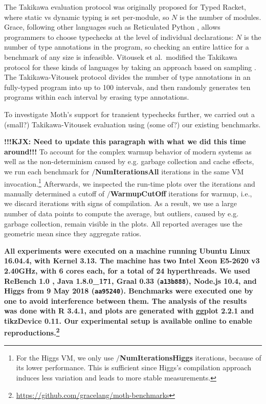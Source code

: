 \documentclass[sigplan,10pt,review,screen]{acmart}\settopmatter{printfolios=true}
\newcommand{\code}[1]{\texttt{#1}}
\newcommand{\ie}{i.e.\xspace}
\newcommand{\eg}{e.g.\xspace}
\begin{document}
The Takikawa evaluation protocol was originally proposed for Typed
Racket, where static vs dynamic typing is set per-module, so $N$ is
the number of modules. Grace, following other languages such as
Reticulated Python \cite{reticPython2014,monotonic2015,Vitousek2017},
allows programmers to choose typechecks at the level of individual
declarations: $N$ is the number of type annotations in the program,
so checking an entire lattice for a benchmark of any size
is infeasible.  Vitousek et al.\ modified the Takikawa protocol for
these kinds of languages by taking an approach based on sampling
\cite{vitousek-transient-arXive-2019}.  The Takikawa-Vitousek protocol
divides the number of type annotations in an fully-typed program into
up to 100 intervals, and then randomly generates ten programs within
each interval by erasing type annotations.

To investigate Moth's support for transient typechecks further, we
carried out a (small?) Takikawa-Vitousek evaluation using (some of?)
our existing benchmarks.

\textbf{!!!KJX: Need to update this paragraph with what we did this time around!!!}
To account for the complex warmup behavior
of modern systems\citep{Barrett:2017:VMW} as well as
the non-determinism caused by \eg garbage collection and cache effects,
we run each benchmark for \textbf{$/$NumIterationsAll} iterations in the same
VM invocation.\footnote{
For the Higgs VM, we only use \textbf{$/$NumIterationsHiggs} iterations,
because of its lower performance.
This is sufficient since Higgs's compilation approach induces less variation
and leads to more stable measurements.}
Afterwards, we inspected the run-time plots over the iterations
and manually determined a cutoff of \textbf{$/$WarmupCutOff} iterations for warmup,
\ie, we discard iterations with signs of compilation.
As a result, we use a large number of data points to compute the average,
but outliers, caused by \eg garbage collection, remain visible in the plots.
All reported averages use the geometric mean since they aggregate
ratios.


\textbf{
%
All experiments were executed on a machine running Ubuntu Linux 16.04.4,
with Kernel 3.13.
The machine has two Intel Xeon E5-2620 v3 2.40GHz,
with 6 cores each, for a total of 24 hyperthreads.
We used ReBench 1.0 \citep{ReBench:2018}, Java 1.8.0\_171, Graal 0.33 (\code{a13b888}),
Node.js 10.4, and Higgs from 9 May 2018 (\code{aa95240}).
Benchmarks were executed one by one to avoid interference between them.
The analysis of the results was done with R 3.4.1,
and plots are generated with ggplot 2.2.1 and tikzDevice 0.11.
Our experimental setup is available online to enable reproductions.\footnote{
\url{https://github.com/gracelang/moth-benchmarks}}
}
\end{document}
